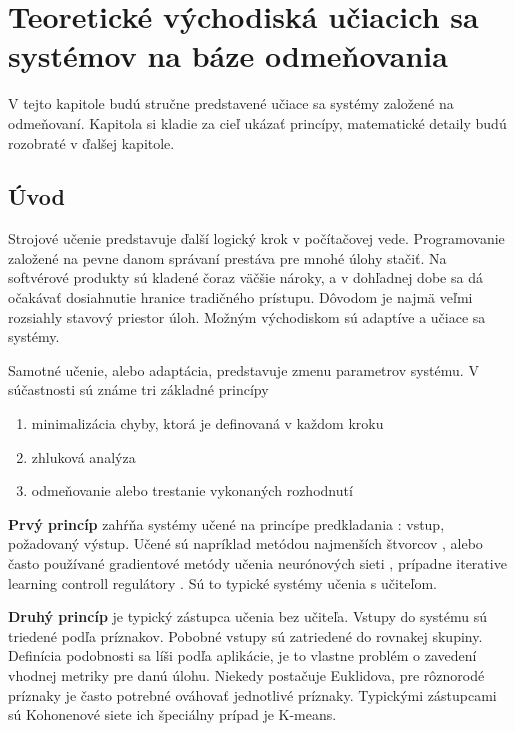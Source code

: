 \chapter{Teoretické východiská učiacich sa systémov na báze odmeňovania}

V tejto kapitole budú stručne predstavené učiace sa systémy založené na odmeňovaní.
Kapitola si kladie za cieľ ukázať princípy, matematické detaily budú
rozobraté v ďalšej kapitole.

\section{Úvod}

Strojové učenie predstavuje ďalší logický krok v počítačovej vede. Programovanie
založené na pevne danom správaní prestáva pre mnohé úlohy stačiť. Na softvérové
produkty sú kladené čoraz väčšie nároky, a v dohľadnej dobe sa dá očakávať
dosiahnutie hranice tradičného prístupu. Dôvodom je najmä veľmi rozsiahly stavový
priestor úloh. Možným východiskom sú adaptíve a učiace sa systémy.

Samotné učenie, alebo adaptácia, predstavuje zmenu parametrov systému.
V súčastnosti sú známe tri základné princípy

\begin{enumerate}
\item minimalizácia chyby, ktorá je definovaná v každom kroku
\item zhluková analýza
\item odmeňovanie alebo trestanie vykonaných rozhodnutí
\end{enumerate}

{\bf Prvý princíp} zahŕňa systémy učené na princípe predkladania :
vstup, požadovaný výstup. Učené sú napríklad metódou najmenších
štvorcov \cite{bib:adaptive_01} \cite{bib:adaptive_02} \cite{bib:adaptive_03},
alebo často používané gradientové metódy učenia neurónových sieti \cite{bib:gradient_01} \cite{bib:gradient_02}
\cite{bib:gradient_03} \cite{bib:backpropagation_00} \cite{bib:gradient_04}, prípadne
iterative learning controll regulátory \cite{bib:ilc_01} \cite{bib:ilc_02}.
Sú to typické systémy učenia s učiteľom.

{\bf Druhý princíp} je typický zástupca učenia bez učiteľa. Vstupy do systému
sú triedené podľa príznakov. Pobobné vstupy sú zatriedené do rovnakej skupiny.
Definícia podobnosti sa líši podľa aplikácie, je to vlastne problém o zavedení vhodnej metriky
pre danú úlohu. Niekedy postačuje Euklidova, pre rôznorodé príznaky je často
potrebné ováhovať jednotlivé príznaky. Typickými zástupcami
sú Kohonenové siete \cite{bib:kohonen_01} \cite{bib:kohonen_02} \cite{bib:kohonen_03} ich špeciálny prípad je K-means.

